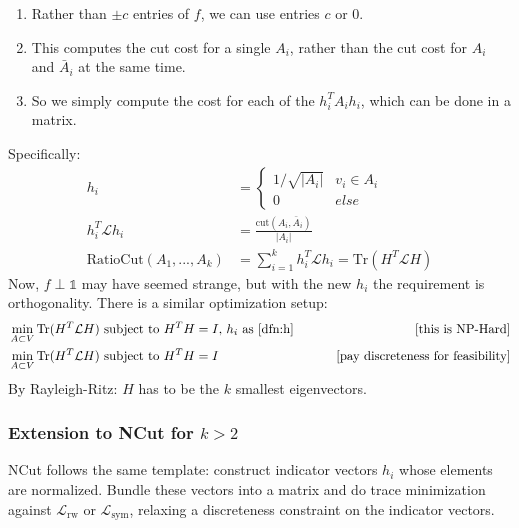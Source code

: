 \documentclass{article}
\newcommand{\an}[1]{{\leavevmode\color{red}{#1}}}
\begin{document}
\begin{enumerate}
    \item Rather than $\pm c$ entries of $f$, we can use entries $c$ or $0$.
    \item This computes the cut cost for a single $A_i$, rather than the cut cost for $A_i$ and $\bar{A}_i$ at the same time.
    \item So we simply compute the cost for each of the $h_i^T A_i h_i$, which can be done in a matrix. \an{Is $A_i$ a matrix?}
\end{enumerate}
Specifically:
\begin{align} 
    \label{dfn:h} h_i & = \begin{cases}
        1/\sqrt{|A_i|} & v_i \in A_i \\
        0 & \textit{else}
    \end{cases} \\
    h_i^T \mathcal{L} h_i & = \frac{\text{cut}(A_i, \bar{A}_i)}{|A_i|} \\
    \text{RatioCut}(A_1, ..., A_k) & = \sum_{i=1}^k h_i^T \mathcal{L} h_i = \text{Tr}(H^T \mathcal{L} H)
\end{align}
Now, $f \perp \mathds{1}$ may have seemed strange, but with the new $h_i$ the requirement is orthogonality. There is a similar optimization setup:
\begin{align}
   &\min_{A \subset V} \text{Tr}(H^T \mathcal{L} H) \text{ subject to $H^T H = I$, $h_i$ as \eqref{dfn:h} }  \qquad &\text{[this is NP-Hard]} \\
   &\min_{A \subset V} \text{Tr}(H^T \mathcal{L} H) \text{ subject to $H^T H = I$}  \qquad &\text{[pay discreteness for feasibility]} 
\end{align}
By Rayleigh-Ritz: $H$ has to be the $k$ smallest eigenvectors.

\subsubsection*{Extension to NCut for $k>2$}
NCut follows the same template: construct indicator vectors $h_i$ whose elements are normalized. Bundle these vectors into a matrix and do trace minimization against $\mathcal{L}_{\text{rw}}$ or $\mathcal{L}_{\text{sym}}$, relaxing a discreteness constraint on the indicator vectors.
\end{document}
